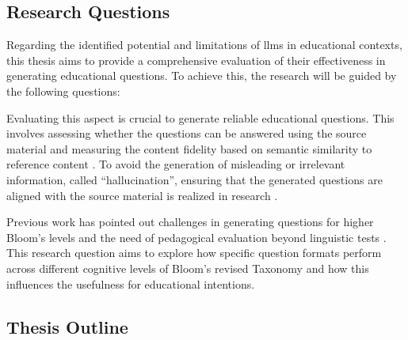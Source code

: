 \subsection{Research Questions}

Regarding the identified potential and limitations of \ac{llms} in educational contexts, this thesis aims to provide a comprehensive evaluation of their effectiveness in generating educational questions. To achieve this, the research will be guided by the following questions:

 Evaluating this aspect is crucial to generate reliable educational questions. This involves assessing whether the questions can be answered using the source material \cite{maity_can_2025,moore_assessing_2022,scaria_automated_2024} and measuring the content fidelity based on semantic similarity to reference content \cite{li_planning_2024}. To avoid the generation of misleading or irrelevant information, called \enquote{hallucination}, ensuring that the generated questions are aligned with the source material is realized in research \cite{al_faraby_analysis_2024}.

 Previous work has pointed out challenges in generating questions for higher Bloom's levels \cite{scaria_automated_2024} and the need of pedagogical evaluation beyond linguistic tests \cite{horbach_linguistic_2020,steuer_i_2021}. This research question aims to explore how specific question formats perform across different cognitive levels of Bloom's revised Taxonomy \cite{krathwohl_revision_2002} and how this influences the usefulness for educational intentions.

\subsection{Thesis Outline}

